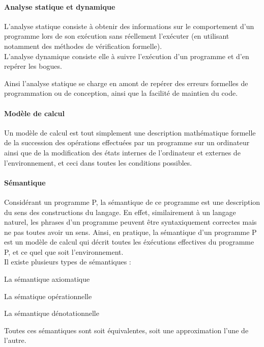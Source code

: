 \documentclass[french]{article}
\begin{document}
\paragraph{Analyse statique et dynamique}
L'analyse statique consiste à obtenir des informations sur le comportement d'un programme
lors de son exécution sans réellement l'exécuter (en utilisant notamment des méthodes de
vérification formelle). \\
L'analyse dynamique consiste elle à suivre l’exécution d'un programme et d'en repérer les bogues.

Ainsi l'analyse statique se charge en amont de repérer des erreurs formelles de programmation
ou de conception, ainsi que la facilité de maintien du code.


\paragraph{Modèle de calcul}
Un modèle de calcul est tout simplement une description mathématique formelle
de la succession des opérations effectuées par un programme sur un ordinateur ainsi que de
la modification des états internes de l'ordinateur et externes de l'environnement, et ceci
dans toutes les conditions possibles.

\paragraph{Sémantique}
Considérant un programme P, la sémantique de ce programme est une description du sens des
constructions du langage. En effet, similairement à un langage naturel, les phrases d'un programme
peuvent être syntaxiquement correctes mais ne pas toutes avoir un sens. Ainsi, en pratique,
la sémantique d'un programme P est un modèle de calcul qui décrit toutes les
éxécutions effectives du programme P, et ce quel que soit l'environnement. \\
Il existe plusieurs types de sémantiques :
\begin{description}
    \item La sémantique axiomatique
    \item La sématique opérationnelle
    \item La sémantique dénotationnelle
\end{description}
Toutes ces sémantiques sont soit équivalentes, soit une approximation l'une de l'autre.
\end{document}
